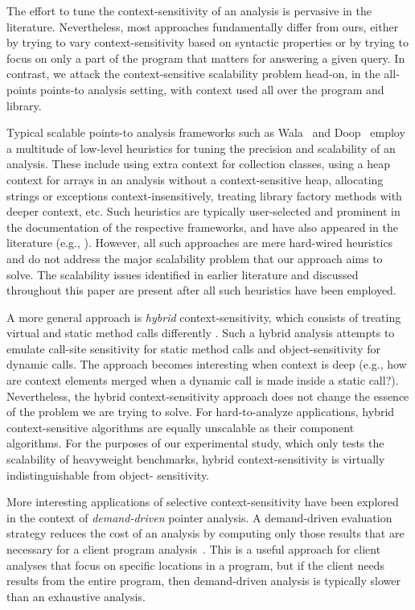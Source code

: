 The effort to tune the context-sensitivity of an analysis is pervasive
in the literature. Nevertheless, most approaches fundamentally differ
from ours, either by trying to vary context-sensitivity based on
syntactic properties or by trying to focus on only a part of the program
that matters for answering a given query.
In contrast, we attack the context-sensitive scalability problem 
head-on, in the all-points points-to analysis setting, with context
used all over the program and library.

Typical scalable points-to analysis frameworks such as
Wala~\cite{www:wala} and Doop~\cite{oopsla:2009:Bravenboer} employ a multitude of
low-level heuristics for tuning the precision and scalability of an
analysis. These include using extra context for collection classes,
using a heap context for arrays in an analysis without a
context-sensitive heap, allocating strings or exceptions
context-insensitively, treating library factory methods with deeper
context, etc. Such heuristics are typically user-selected and
prominent in the documentation of the respective frameworks, and have
also appeared in the literature (e.g.,
\cite{pldi:2009:Tripp,cc:2013:Kastrinis}).  However, all
such approaches are mere hard-wired heuristics and do not address the
major scalability problem that our approach aims to solve. The
scalability issues identified in earlier literature and discussed
throughout this paper are present after all such heuristics have been
employed.

A more general approach is \emph{hybrid} context-sensitivity, which
consists of treating virtual and static method calls differently
\cite{pldi:2013:Kastrinis}. Such a hybrid analysis attempts to emulate
call-site sensitivity for static method calls and object-sensitivity
for dynamic calls. The approach becomes interesting when context is
deep (e.g., how are context elements merged when a dynamic call is
made inside a static call?). Nevertheless, the hybrid
context-sensitivity approach does not change the essence of the
problem we are trying to solve. For hard-to-analyze applications,
hybrid context-sensitive algorithms are equally unscalable as their
component algorithms. For the purposes of our experimental study,
which only tests the scalability of heavyweight benchmarks, hybrid
context-sensitivity is virtually indistinguishable from object-
sensitivity.

More interesting applications of selective context-sensitivity have
been explored in the context of \emph{demand-driven} pointer analysis.
A demand-driven evaluation strategy reduces the cost of an analysis by
computing only those results that are necessary for a client program
analysis~\cite{oopsla:2005:Sridharan,pldi:2006:Sridharan,popl:2008:Zheng,pldi:2001:Heintze}. This is a useful
approach for client analyses that focus on specific locations in a
program, but if the client needs results from the entire program, then
demand-driven analysis is typically slower than an exhaustive
analysis.

